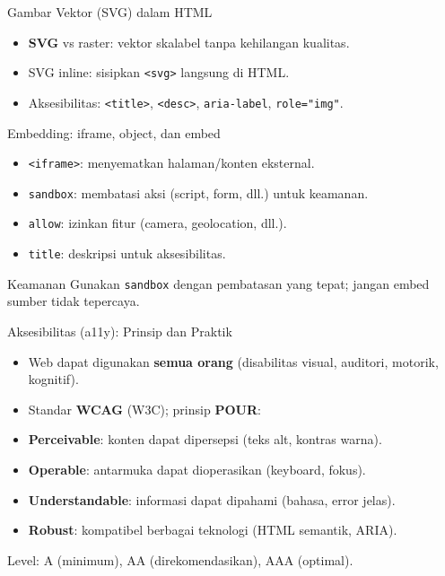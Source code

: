 \documentclass[handout]{beamer}
\begin{document}
\begin{frame}{Gambar Vektor (SVG) dalam HTML}
	\begin{itemize}
		\item \textbf{SVG} vs raster: vektor skalabel tanpa kehilangan kualitas.
		\item SVG inline: sisipkan \texttt{<svg>} langsung di HTML.
		\item Aksesibilitas: \texttt{<title>}, \texttt{<desc>}, \texttt{aria-label}, \texttt{role="img"}.
	\end{itemize}
\end{frame}

\begin{frame}{Embedding: iframe, object, dan embed}
	\begin{itemize}
		\item \texttt{<iframe>}: menyematkan halaman/konten eksternal.
		\item \texttt{sandbox}: membatasi aksi (script, form, dll.) untuk keamanan.
		\item \texttt{allow}: izinkan fitur (camera, geolocation, dll.).
		\item \texttt{title}: deskripsi untuk aksesibilitas.
	\end{itemize}
	\begin{block}{Keamanan}
		Gunakan \texttt{sandbox} dengan pembatasan yang tepat; jangan embed sumber tidak tepercaya.
	\end{block}
\end{frame}

\begin{frame}{Aksesibilitas (a11y): Prinsip dan Praktik}
	\begin{itemize}
		\item Web dapat digunakan \textbf{semua orang} (disabilitas visual, auditori, motorik, kognitif).
		\item Standar \textbf{WCAG} (W3C); prinsip \textbf{POUR}:
		\item \textbf{Perceivable}: konten dapat dipersepsi (teks alt, kontras warna).
		\item \textbf{Operable}: antarmuka dapat dioperasikan (keyboard, fokus).
		\item \textbf{Understandable}: informasi dapat dipahami (bahasa, error jelas).
		\item \textbf{Robust}: kompatibel berbagai teknologi (HTML semantik, ARIA).
	\end{itemize}
	Level: A (minimum), AA (direkomendasikan), AAA (optimal).
\end{frame}
\end{document}
